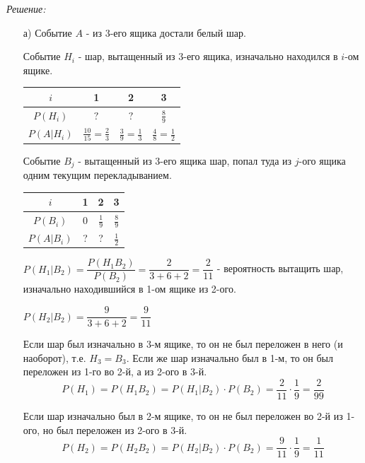 \textit{Решение:}

\begin{enumerate}
	\item[а)] Событие $A$ - из 3-его ящика достали белый шар.
	
	Событие $H_i$ - шар, вытащенный из 3-его ящика, изначально находился в $i$-ом ящике.
	
	\begin{table}[h]
		\centering\makegapedcells
		\begin{tabular}{|c|c|c|c|}
			\hline
			$i$        & 1                           & 2                         & 3                         \\ \hline
			$P(H_i)$   & $?$                         & $?$                       & $\frac{8}{9}$             \\ \hline
			$P(A|H_i)$ & $\frac{10}{15}=\frac{2}{3}$ & $\frac{3}{9}=\frac{1}{3}$ & $\frac{4}{8}=\frac{1}{2}$ \\ \hline
		\end{tabular}
	\end{table}

	Событие $B_j$ - вытащенный из 3-его ящика шар, попал туда из $j$-ого ящика одним текущим перекладыванием.
	
	\begin{table}[h]
		\centering\makegapedcells
		\begin{tabular}{|c|c|c|c|}
			\hline
			$i$        & 1 & 2             & 3             \\ \hline
			$P(B_i)$   & 0 & $\frac{1}{9}$ & $\frac{8}{9}$ \\ \hline
			$P(A|B_i)$ & ? & ?             & $\frac{1}{2}$ \\ \hline
		\end{tabular}
	\end{table}


	$P(H_1|B_2) = \dfrac{P(H_1B_2)}{P(B_2)}= \dfrac{2}{3 + 6 + 2} = \dfrac{2}{11}$ - вероятность вытащить шар, изначально находившийся в 1-ом ящике из 2-ого.
	
	$P(H_2|B_2) = \dfrac{9}{3 + 6 + 2} = \dfrac{9}{11}$
	
	Если шар был изначально в 3-м ящике, то он не был переложен в него (и наоборот), т.е. $H_3=B_3$. Если же шар изначально был в 1-м, то он был переложен из 1-го во 2-й, а из 2-ого в 3-й.
	\[ P(H_1) = P(H_1B_2) = P(H_1|B_2) \cdot P(B_2) = \dfrac{2}{11} \cdot \dfrac{1}{9} = \dfrac{2}{99} \]
	
	Если шар изначально был в 2-м ящике, то он не был переложен во 2-й из 1-ого, но был переложен из 2-ого в 3-й.
	\[ P(H_2) = P(H_2B_2) = P(H_2|B_2) \cdot P(B_2) = \dfrac{9}{11} \cdot \dfrac{1}{9} = \dfrac{1}{11} \]
	

\end{enumerate}

